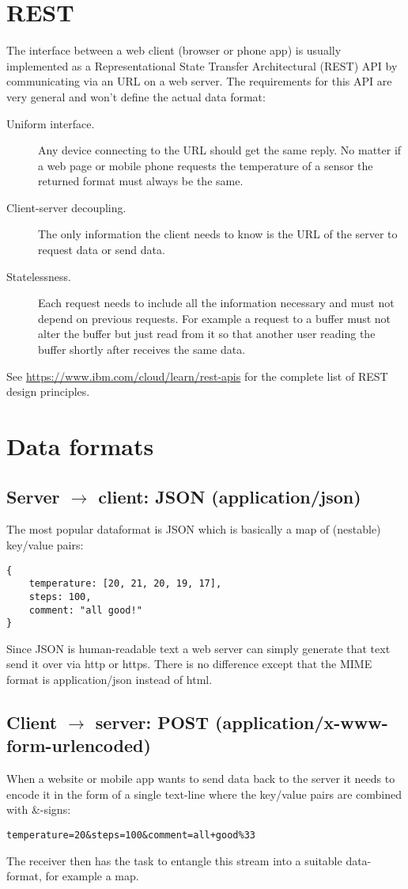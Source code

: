\documentclass[12pt]{report}
\begin{document}
\section{REST}
The interface between a web client (browser or phone app) is usually
implemented as a Representational State Transfer Architectural (REST)
API by communicating via an URL on a web server. The requirements
for this API are very general and won't define the actual data format:
\begin{description}
\item[Uniform interface.] Any device connecting to the URL should
  get the same reply. No matter if a web page or mobile phone
  requests the temperature of a sensor the returned format must always be the same.
\item[Client-server decoupling.] The only information
  the client needs to know is the URL of the server to request data or send data.
\item[Statelessness.] Each request needs to include all the
  information necessary and must not depend on previous requests. For
  example a request to a buffer must not alter the
  buffer but just read from it so that another user reading the buffer
  shortly after receives the same data.
\end{description}
See \url{https://www.ibm.com/cloud/learn/rest-apis} for the complete
list of REST design principles.

\section{Data formats}
\subsection{Server $\to$ client: JSON (application/json)}
The most popular dataformat is JSON which is basically a
map of (nestable) key/value pairs:
\begin{verbatim}
{
    temperature: [20, 21, 20, 19, 17],
    steps: 100,
    comment: "all good!"
}
\end{verbatim}
Since JSON is human-readable text a web server can simply
generate that text send it over via http or https. There
is no difference except that the MIME format is \textquotesingle application/json\textquotesingle{}
instead of html.

\subsection{Client $\to$ server: POST (application/x-www-form-urlencoded)}
When a website or mobile app wants to send data back to the server it
needs to encode it in the form of a single text-line where the
key/value pairs are combined with \&-signs:
\begin{verbatim}
temperature=20&steps=100&comment=all+good%33
\end{verbatim}
The receiver then has the task to entangle this stream into a suitable data-format,
for example a map.
\end{document}

